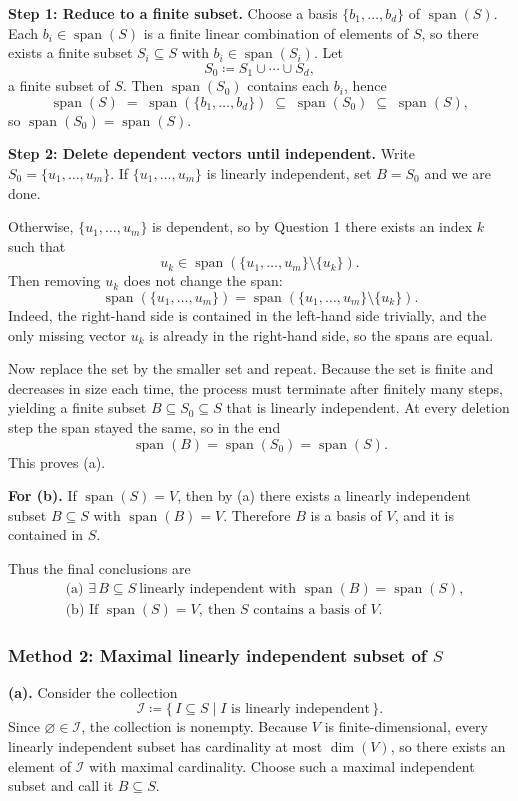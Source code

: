 \documentclass[12pt]{article}
\newcommand{\Span}{\operatorname{span}}
\newcommand{\dimn}{\operatorname{dim}}
\begin{document}
\textbf{Step 1: Reduce to a finite subset.}
Choose a basis \(\{b_1,\ldots,b_d\}\) of \(\Span(S)\).
Each \(b_i\in \Span(S)\) is a finite linear combination of elements of \(S\), so there exists a finite subset \(S_i\subseteq S\) with \(b_i\in\Span(S_i)\).
Let
\[
S_0\coloneqq S_1\cup\cdots\cup S_d,
\]
a finite subset of \(S\).
Then \(\Span(S_0)\) contains each \(b_i\), hence
\[
\Span(S)\;=\;\Span(\{b_1,\ldots,b_d\})\;\subseteq\;\Span(S_0)\;\subseteq\;\Span(S),
\]
so \(\Span(S_0)=\Span(S)\).

\textbf{Step 2: Delete dependent vectors until independent.}
Write \(S_0=\{u_1,\ldots,u_m\}\).
If \(\{u_1,\ldots,u_m\}\) is linearly independent, set \(B=S_0\) and we are done.

Otherwise, \(\{u_1,\ldots,u_m\}\) is dependent, so by Question 1 there exists an index \(k\) such that
\[
u_k\in \Span(\{u_1,\ldots,u_m\}\setminus\{u_k\}).
\]
Then removing \(u_k\) does not change the span:
\[
\Span(\{u_1,\ldots,u_m\})=\Span(\{u_1,\ldots,u_m\}\setminus\{u_k\}).
\]
Indeed, the right-hand side is contained in the left-hand side trivially, and the only missing vector \(u_k\) is already in the right-hand side, so the spans are equal.

Now replace the set by the smaller set and repeat.
Because the set is finite and decreases in size each time, the process must terminate after finitely many steps, yielding a finite subset \(B\subseteq S_0\subseteq S\) that is linearly independent.
At every deletion step the span stayed the same, so in the end
\[
\Span(B)=\Span(S_0)=\Span(S).
\]
This proves (a).

\textbf{For (b).}
If \(\Span(S)=V\), then by (a) there exists a linearly independent subset \(B\subseteq S\) with \(\Span(B)=V\).
Therefore \(B\) is a basis of \(V\), and it is contained in \(S\).

Thus the final conclusions are
\[
\boxed{
\begin{aligned}
&\text{(a) } \exists\,B\subseteq S\ \text{linearly independent with } \Span(B)=\Span(S),\\
&\text{(b) If }\Span(S)=V,\ \text{then } S \text{ contains a basis of }V.
\end{aligned}}
\]

\subsubsection{Method 2: Maximal linearly independent subset of \(S\)}
\textbf{(a).}
Consider the collection
\[
\mathcal{I}\coloneqq \{\,I\subseteq S \mid I \text{ is linearly independent}\,\}.
\]
Since \(\varnothing\in\mathcal{I}\), the collection is nonempty.
Because \(V\) is finite-dimensional, every linearly independent subset has cardinality at most \(\dimn(V)\), so there exists an element of \(\mathcal{I}\) with maximal cardinality.
Choose such a maximal independent subset and call it \(B\subseteq S\).
\end{document}
